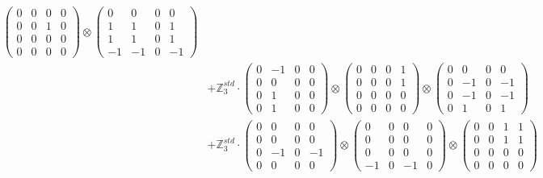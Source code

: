 \documentclass{article}
\begin{document}
{\begin{align}
            \begin{pmatrix} 0 & 0 & 0 & 0 \\ 0 & 0 & 1 & 0 \\ 0 & 0 & 0 & 0 \\ 0 & 0 & 0 & 0 \end{pmatrix} \otimes 
            \begin{pmatrix} 0 & 0 & 0 & 0 \\ 1 & 1 & 0 & 1 \\ 1 & 1 & 0 & 1 \\ -1 & -1 & 0 & -1 \end{pmatrix} \\ 
        &+ \label{Rs16-Rc11-Solution-13-c20} \mathbb{Z}_3^{std} \cdot 
            \begin{pmatrix} 0 & -1 & 0 & 0 \\ 0 & 0 & 0 & 0 \\ 0 & 1 & 0 & 0 \\ 0 & 1 & 0 & 0 \end{pmatrix} \otimes 
            \begin{pmatrix} 0 & 0 & 0 & 1 \\ 0 & 0 & 0 & 1 \\ 0 & 0 & 0 & 0 \\ 0 & 0 & 0 & 0 \end{pmatrix} \otimes 
            \begin{pmatrix} 0 & 0 & 0 & 0 \\ 0 & -1 & 0 & -1 \\ 0 & -1 & 0 & -1 \\ 0 & 1 & 0 & 1 \end{pmatrix} \\ 
        &+ \label{Rs16-Rc11-Solution-13-c21} \mathbb{Z}_3^{std} \cdot 
            \begin{pmatrix} 0 & 0 & 0 & 0 \\ 0 & 0 & 0 & 0 \\ 0 & -1 & 0 & -1 \\ 0 & 0 & 0 & 0 \end{pmatrix} \otimes 
            \begin{pmatrix} 0 & 0 & 0 & 0 \\ 0 & 0 & 0 & 0 \\ 0 & 0 & 0 & 0 \\ -1 & 0 & -1 & 0 \end{pmatrix} \otimes 
            \begin{pmatrix} 0 & 0 & 1 & 1 \\ 0 & 0 & 1 & 1 \\ 0 & 0 & 0 & 0 \\ 0 & 0 & 0 & 0 \end{pmatrix} \\ 

\end{align}}
\end{document}
